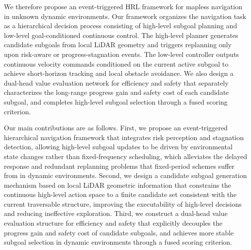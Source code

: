 We therefore propose an event-triggered HRL framework for mapless navigation in unknown dynamic environments. Our framework organizes the navigation task as a hierarchical decision process consisting of high-level subgoal planning and low-level goal-conditioned continuous control. The high-level planner generates candidate subgoals from local LiDAR geometry and triggers replanning only upon risk-aware or progress-stagnation events. The low-level controller outputs continuous velocity commands conditioned on the current active subgoal to achieve short-horizon tracking and local obstacle avoidance. We also design a dual-head value evaluation network for efficiency and safety that separately characterizes the long-range progress gain and safety cost of each candidate subgoal, and completes high-level subgoal selection through a fused scoring criterion.

Our main contributions are as follows. First, we propose an event-triggered hierarchical navigation framework that integrates risk perception and stagnation detection, allowing high-level subgoal updates to be driven by environmental state changes rather than fixed-frequency scheduling, which alleviates the delayed response and redundant replanning problems that fixed-period schemes suffer from in dynamic environments. Second, we design a candidate subgoal generation mechanism based on local LiDAR geometric information that constrains the continuous high-level action space to a finite candidate set consistent with the current traversable structure, improving the executability of high-level decisions and reducing ineffective exploration. Third, we construct a dual-head value evaluation structure for efficiency and safety that explicitly decouples the progress gain and safety cost of candidate subgoals, and achieves more stable subgoal selection in dynamic environments through a fused scoring criterion.




